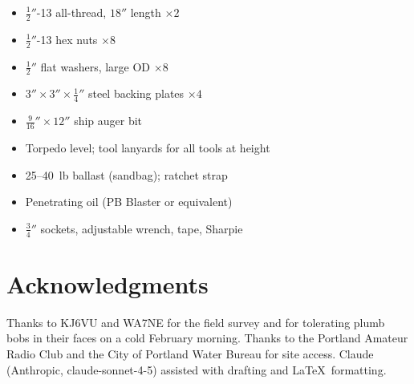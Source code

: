 \documentclass[11pt,twocolumn]{article}
\begin{document}
\begin{itemize}[leftmargin=*, itemsep=2pt]
  \item[$\square$] $\tfrac{1}{2}''$-13 all-thread, $18''$ length $\times 2$
  \item[$\square$] $\tfrac{1}{2}''$-13 hex nuts $\times 8$
  \item[$\square$] $\tfrac{1}{2}''$ flat washers, large OD $\times 8$
  \item[$\square$] $3'' \times 3'' \times \tfrac{1}{4}''$ steel backing plates $\times 4$
  \item[$\square$] $\tfrac{9}{16}'' \times 12''$ ship auger bit
  \item[$\square$] Torpedo level; tool lanyards for all tools at height
  \item[$\square$] 25--40~lb ballast (sandbag); ratchet strap
  \item[$\square$] Penetrating oil (PB Blaster or equivalent)
  \item[$\square$] $\tfrac{3}{4}''$ sockets, adjustable wrench, tape, Sharpie
\end{itemize}

\section*{Acknowledgments}

Thanks to KJ6VU and WA7NE for the field survey and for tolerating plumb bobs
in their faces on a cold February morning. Thanks to the Portland Amateur Radio
Club and the City of Portland Water Bureau for site access. Claude (Anthropic,
claude-sonnet-4-5) assisted with drafting and \LaTeX\ formatting.
\end{document}
